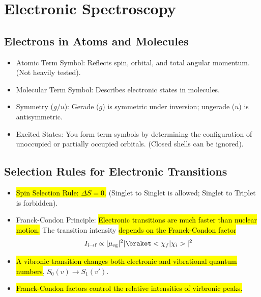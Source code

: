 
\chapter{Electronic Spectroscopy}

\section{Electrons in Atoms and Molecules}

\begin{itemize}
  \item Atomic Term Symbol: Reflects spin, orbital, and total angular
  momentum. (Not heavily tested).
  \item Molecular Term Symbol: Describes electronic states in molecules.
  \item Symmetry ($g/u$): Gerade ($g$) is symmetric under inversion;
  ungerade ($u$) is antisymmetric. 
  \item Excited States: You form term symbols by determining the configuration
  of unoccupied or partially occupied orbitals. (Closed shells can be ignored).
\end{itemize}

\section{Selection Rules for Electronic Transitions}
\begin{itemize}
    \item \hl{Spin Selection Rule: $\Delta S = 0$.}
    (Singlet to Singlet is allowed; Singlet to Triplet is forbidden).
    \item Franck-Condon Principle: \hl{Electronic transitions are much faster
    than nuclear motion.} The transition intensity
    \hl{depends on the Franck-Condon factor}
    \[
      I_{\text i\to\text f} \propto |\mu_\text{eg}|^2
      |\braket<\chi_f|\chi_i>|^2
    \]
    \item \hl{A vibronic transition changes both electronic and vibrational
      quantum numbers}, $S_0(v) \to S_1(v')$.
    \item \hl{Franck-Condon factors control the relative intensities of
    virbronic peaks.}
\end{itemize}

